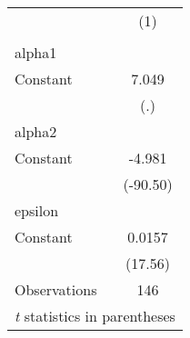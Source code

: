 \begin{tabular}{l*{1}{c}}
\hline\hline
                    &\multicolumn{1}{c}{(1)}\\
                    &\multicolumn{1}{c}{}\\
\hline
alpha1              &            \\
Constant            &       7.049\\
                    &         (.)\\
\hline
alpha2              &            \\
Constant            &      -4.981\\
                    &    (-90.50)\\
\hline
epsilon             &            \\
Constant            &      0.0157\\
                    &     (17.56)\\
\hline
Observations        &         146\\
\hline\hline
\multicolumn{2}{l}{\footnotesize \textit{t} statistics in parentheses}\\
\end{tabular}
